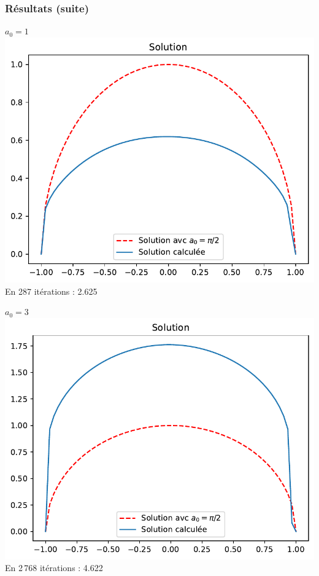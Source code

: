 \documentclass[11pt,envcountsect,aspectratio=169]{beamer} %
\begin{document}
\begin{frame}
\begin{center}
    \end{center}

    

\end{frame}


\begin{frame}
\frametitle{Résultats (suite)}

\begin{center}

\begin{multicols}{2}
$a_0=1$
\includegraphics[scale=0.5]{../res/petit_sol}
En 287 itérations : 2.625

$a_0=3$
\includegraphics[scale=0.5]{../res/trois_sol}
En 2\,768 itérations : 4.622
\end{multicols}
\end{center}

\end{frame}
\end{document}
